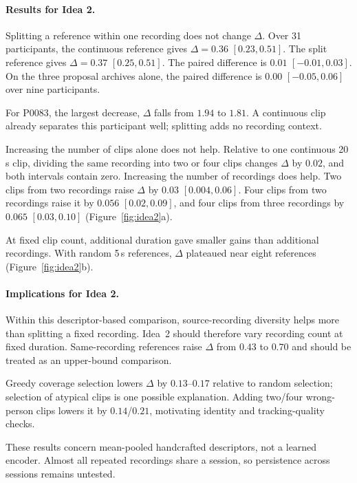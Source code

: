 \paragraph{Results for Idea 2.}
Splitting a reference within one recording does not change $\Delta$. Over 31 participants, the continuous reference gives $\Delta = 0.36$ $[0.23, 0.51]$. The split reference gives $\Delta = 0.37$ $[0.25, 0.51]$. The paired difference is $0.01$ $[-0.01, 0.03]$. On the three proposal archives alone, the paired difference is $0.00$ $[-0.05, 0.06]$ over nine participants.

For P0083, the largest decrease, $\Delta$ falls from $1.94$ to $1.81$. A continuous clip already separates this participant well; splitting adds no recording context.

Increasing the number of clips alone does not help. Relative to one continuous 20\,s clip, dividing the same recording into two or four clips changes $\Delta$ by $0.02$, and both intervals contain zero. Increasing the number of recordings does help. Two clips from two recordings raise $\Delta$ by $0.03$ $[0.004, 0.06]$. Four clips from two recordings raise it by $0.056$ $[0.02, 0.09]$, and four clips from three recordings by $0.065$ $[0.03, 0.10]$ (Figure~\ref{fig:idea2}a).

At fixed clip count, additional duration gave smaller gains than additional recordings. With random 5\,s references, $\Delta$ plateaued near eight references (Figure~\ref{fig:idea2}b).

\paragraph{Implications for Idea 2.}
Within this descriptor-based comparison, source-recording diversity helps more than splitting a fixed recording. Idea~2 should therefore vary recording count at fixed duration. Same-recording references raise $\Delta$ from $0.43$ to $0.70$ and should be treated as an upper-bound comparison.

Greedy coverage selection lowers $\Delta$ by $0.13$--$0.17$ relative to random selection; selection of atypical clips is one possible explanation. Adding two/four wrong-person clips lowers it by $0.14$/$0.21$, motivating identity and tracking-quality checks.

These results concern mean-pooled handcrafted descriptors, not a learned encoder. Almost all repeated recordings share a session, so persistence across sessions remains untested.
